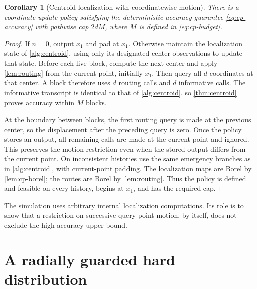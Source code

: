 \documentclass[11pt]{article}
\numberwithin{equation}{section}
\newtheorem{corollary}[corollary]{Corollary}
\theoremstyle{definition}
\theoremstyle{remark}
\begin{document}
\begin{corollary}[Centroid localization with coordinatewise motion]\label{cor:routed-centroid}
There is a coordinate-update policy satisfying the deterministic accuracy guarantee \eqref{eq:cp-accuracy} with pathwise cap $2dM$, where $M$ is defined in \eqref{eq:cp-budget}.
\end{corollary}
\begin{proof}
If $n=0$, output $x_1$ and pad at $x_1$. Otherwise maintain the localization state of \cref{alg:centroid}, using only its designated center observations to update that state. Before each live block, compute the next center and apply \cref{lem:routing} from the current point, initially $x_1$. Then query all $d$ coordinates at that center. A block therefore uses $d$ routing calls and $d$ informative calls. The informative transcript is identical to that of \cref{alg:centroid}, so \cref{thm:centroid} proves accuracy within $M$ blocks.

At the boundary between blocks, the first routing query is made at the previous center, so the displacement after the preceding query is zero. Once the policy stores an output, all remaining calls are made at the current point and ignored. This preserves the motion restriction even when the stored output differs from the current point. On inconsistent histories use the same emergency branches as in \cref{alg:centroid}, with current-point padding. The localization maps are Borel by \cref{lem:cp-borel}; the routes are Borel by \cref{lem:routing}. Thus the policy is defined and feasible on every history, begins at $x_1$, and has the required cap.
\end{proof}

The simulation uses arbitrary internal localization computations. Its role is to show that a restriction on successive query-point motion, by itself, does not exclude the high-accuracy upper bound.

\section{A radially guarded hard distribution}\label{sec:hard}
\end{document}
